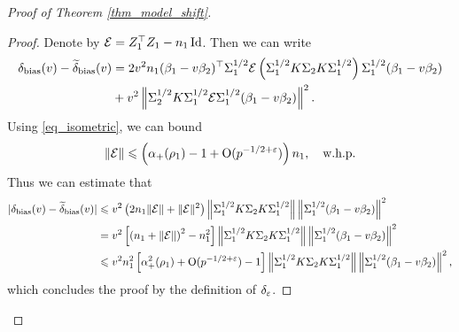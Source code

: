 \begin{proof}[Proof of Theorem \ref{thm_model_shift}]
\begin{proof}
	Denote by $\mathcal{E} = Z_1^{\top}Z_1 - {n_1}\operatorname{Id}$. Then we can write
	\begin{align}
		 \delta_{\text{bias}}(v)-\widetilde\delta_{\text{bias}}(v)&= {2v^2n_1}(\beta_1 - v\beta_2)^{\top}\Sigma_1^{1/2} \mathcal{E}\left(\Sigma_1^{1/2}K \Sigma_2 K \Sigma_1^{1/2}\right) \Sigma_1^{1/2} (\beta_1 - v\beta_2) \nonumber
		\\
		&+ v^2\left\| \Sigma_2^{1/2} K \Sigma_1^{1/2}\mathcal{E} \Sigma_1^{1/2}(\beta_1 - v\beta_2) \right\|^2. \label{eq_lem_model_shift_1}
	\end{align}
	Using \eqref{eq_isometric}, we can bound  
	$$\|\mathcal E\|\leqslant \left( \alpha_+(\rho_1)-1 + \operatorname{O}(p^{-1/2+{\varepsilon}})\right)n_1, \quad \text{w.h.p.}$$
	Thus we can estimate that 
	\begin{align*}
	| \delta_{\text{bias}}(v)-\widetilde\delta_{\text{bias}}(v)|&\leqslant v^2 \left( 2n_1  \|\mathcal E\| +  \|\mathcal E\|^2 \right) \left\| \Sigma_1^{1/2} K \Sigma_2 K \Sigma_1^{1/2} \right\| \left\| \Sigma_1^{1/2} (\beta_1 - v\beta_2) \right\|^2 \\
	&=  v^2 \left[\left( n_1 + \|\mathcal E\|\right)^2 -n_1^2 \right] \left\| \Sigma_1^{1/2} K \Sigma_2 K \Sigma_1^{1/2} \right\| \left\| \Sigma_1^{1/2} (\beta_1 - v\beta_2) \right\|^2 \\
	& \leqslant v^2 n_1^2 \left[ \alpha_+^2(\rho_1) + \operatorname{O}(p^{-1/2+{\varepsilon}}) -1\right]\left\| \Sigma_1^{1/2} K \Sigma_2 K \Sigma_1^{1/2} \right\| \left\| \Sigma_1^{1/2} (\beta_1 - v\beta_2) \right\|^2,
	\end{align*}
	which concludes the proof by the definition of $\delta_{\varepsilon}$.	

\end{proof}
\end{proof}
